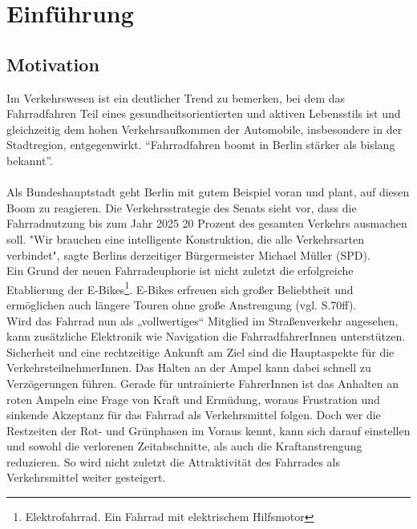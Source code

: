 \chapter{\label{chap:einleitung}Einführung}
\section{Motivation}
Im Verkehrswesen ist ein deutlicher Trend zu bemerken, bei dem das Fahrradfahren Teil eines gesundheitsorientierten und aktiven Lebensstils ist und gleichzeitig dem hohen Verkehrsaufkommen der Automobile, insbesondere in der Stadtregion, entgegenwirkt. “Fahrradfahren boomt in Berlin stärker als bislang bekannt”. \cite{Mopo}\\\\
Als Bundeshauptstadt geht Berlin mit gutem Beispiel voran und plant, auf diesen Boom zu reagieren. Die Verkehrsstrategie des Senats sieht vor, dass die Fahrradnutzung bis zum Jahr 2025 20 Prozent des gesamten Verkehrs ausmachen soll. "Wir brauchen eine intelligente Konstruktion, die alle Verkehrsarten verbindet", sagte Berlins derzeitiger Bürgermeister Michael Müller (SPD). \cite{Mopo}\\
Ein Grund der neuen Fahrradeuphorie ist nicht zuletzt die erfolgreiche Etablierung der E-Bikes\footnote{ Elektrofahrrad. Ein Fahrrad mit elektrischem Hilfsmotor}. E-Bikes erfreuen sich großer Beliebtheit und ermöglichen auch längere Touren ohne große Anstrengung (vgl. \cite{ebikes} S.70ff).\\ 
Wird das Fahrrad nun als „vollwertiges“ Mitglied im Straßenverkehr angesehen, kann zusätzliche Elektronik wie Navigation die FahrradfahrerInnen unterstützen. Sicherheit und eine rechtzeitige Ankunft am Ziel sind die Hauptaspekte für die VerkehrsteilnehmerInnen. Das Halten an der Ampel kann dabei schnell zu Verzögerungen führen. Gerade für untrainierte FahrerInnen ist das Anhalten an roten Ampeln eine Frage von Kraft und Ermüdung, woraus Frustration und sinkende Akzeptanz für das Fahrrad als Verkehrsmittel folgen. Doch wer die Restzeiten der Rot- und Grünphasen im Voraus kennt, kann sich darauf einstellen und sowohl die verlorenen Zeitabschnitte, als auch die Kraftanstrengung reduzieren. So wird nicht zuletzt die Attraktivität des Fahrrades als Verkehrsmittel weiter gesteigert. 
\clearpage
